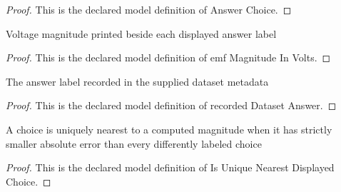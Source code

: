 \begin{proof}
  This is the declared model definition of Answer Choice.
\end{proof}
\begin{definition}
  \label{def:physics:phyx-mini-0936:phyxminiproblems-problemphyxmini0936-answerchoice-emfmagnitudeinvolts}
  Voltage magnitude printed beside each displayed answer label
\end{definition}
\begin{proof}
  This is the declared model definition of emf Magnitude In Volts.
\end{proof}
\begin{definition}
  \label{def:physics:phyx-mini-0936:phyxminiproblems-problemphyxmini0936-recordeddatasetanswer}
  The answer label recorded in the supplied dataset metadata
\end{definition}
\begin{proof}
  This is the declared model definition of recorded Dataset Answer.
\end{proof}
\begin{definition}
  \label{def:physics:phyx-mini-0936:phyxminiproblems-problemphyxmini0936-isuniquenearestdisplayedchoice}
  A choice is uniquely nearest to a computed magnitude when it has strictly smaller absolute error than every differently labeled choice
\end{definition}
\begin{proof}
  This is the declared model definition of Is Unique Nearest Displayed Choice.
\end{proof}
